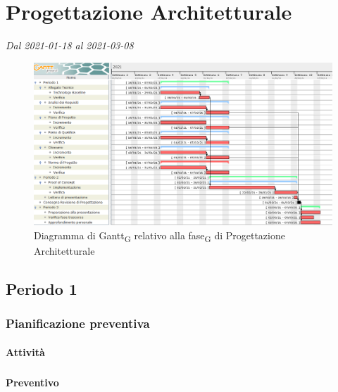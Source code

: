 \section{Progettazione Architetturale}
\textit{Dal 2021-01-18 al 2021-03-08}


\begin{figure}[H]
	\centering
	\includegraphics[scale=0.48]{res/images/gantt_fase/03_gantt_progettazione.png}
	\caption{Diagramma di Gantt\textsubscript{G} relativo alla fase\textsubscript{G} di Progettazione Architetturale}
\end{figure}


\subsection{Periodo 1}

\subsubsection{Pianificazione preventiva}

\paragraph{Attività}
\subparagraph*{}

\planningTable{
	
}

\paragraph{Preventivo}
\subparagraph*{}

